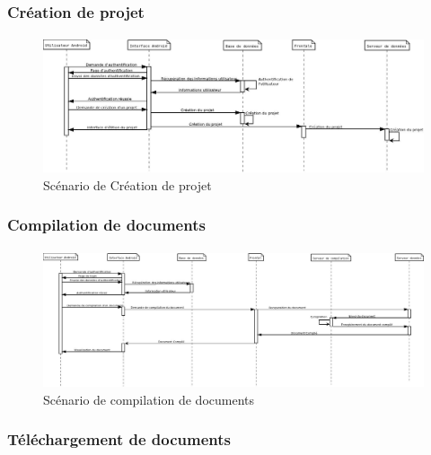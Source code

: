 \documentclass[a4paper,12pt]{article}
\begin{document}
\newpage
\subsubsection{Création de projet}
\paragraph{}
\begin{figure}[!ht]
\begin{center}
  \includegraphics[width=1\textwidth, angle=90]{./Diagramme/Android/CreationProjet.jpg}
\end{center}
  \caption{Scénario de Création de projet}
  \label{androidCreateProject}
\end{figure}

\newpage
\subsubsection{Compilation de documents}
\paragraph{}
\begin{figure}[!ht]
\begin{center}
  \includegraphics[width=1\textwidth, angle=90]{./Diagramme/Android/DemandeCompilation.jpg}
\end{center}
  \caption{Scénario de compilation de documents}
  \label{androidCompile}
\end{figure}

\newpage
\subsubsection{Téléchargement de documents}
\end{document}
